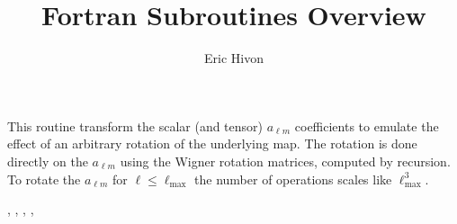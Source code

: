 
\sloppy


\title{\healpix Fortran Subroutines Overview}
 \section[rotate\_alm*]{ }
\label{sub:rotate_alm}
\author{Eric Hivon}

\begin{facility}
{This routine transform the scalar (and tensor) $a_{\ell m}$ coefficients to
emulate the effect of an arbitrary rotation of the underlying map. The rotation is done
directly on the $a_{\ell m}$ using the Wigner rotation matrices, computed by
recursion.
To rotate the $a_{\ell m}$ for $\ell \leq \ell_\textrm{max}$ the number of
operations scales like $\ell^3_\textrm{max}$.}
{\modAlmTools}
\end{facility}

\begin{f90format}
{%
, %
, %
, %
, %
}
\end{f90format}

